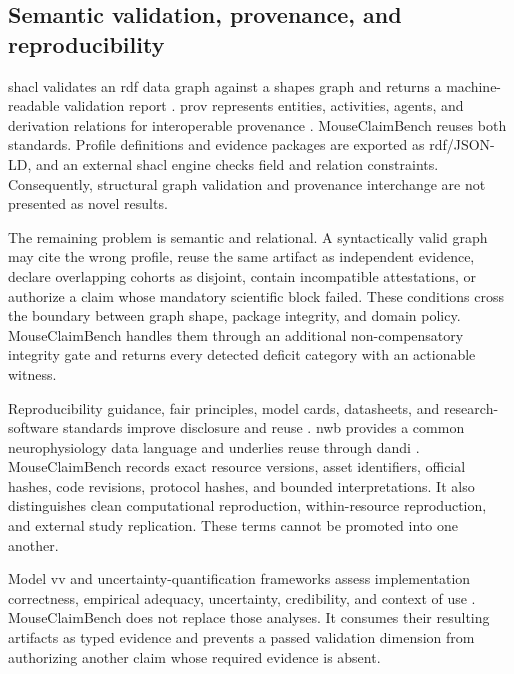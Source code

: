 \subsection{Semantic validation, provenance, and reproducibility}
\label{subsec:semantic-standards}

\ac{shacl} validates an \ac{rdf} data graph against a shapes graph and returns a machine-readable validation report \citep{w3c2017shacl}. \ac{prov} represents entities, activities, agents, and derivation relations for interoperable provenance \citep{lebo2013provo}. MouseClaimBench reuses both standards. Profile definitions and evidence packages are exported as \ac{rdf}/JSON-LD, and an external \ac{shacl} engine checks field and relation constraints. Consequently, structural graph validation and provenance interchange are not presented as novel results.

The remaining problem is semantic and relational. A syntactically valid graph may cite the wrong profile, reuse the same artifact as independent evidence, declare overlapping cohorts as disjoint, contain incompatible attestations, or authorize a claim whose mandatory scientific block failed. These conditions cross the boundary between graph shape, package integrity, and domain policy. MouseClaimBench handles them through an additional non-compensatory integrity gate and returns every detected deficit category with an actionable witness.

Reproducibility guidance, \ac{fair} principles, model cards, datasheets, and research-software standards improve disclosure and reuse \citep{nasem2019reproducibility,wilkinson2016fair,mitchell2019modelcards,gebru2021datasheets,pineau2021reproducibility,barker2022fair4rs}. \ac{nwb} provides a common neurophysiology data language and underlies reuse through \ac{dandi} \citep{rubel2022nwb}. MouseClaimBench records exact resource versions, asset identifiers, official hashes, code revisions, protocol hashes, and bounded interpretations. It also distinguishes clean computational reproduction, within-resource reproduction, and external study replication. These terms cannot be promoted into one another.

Model \ac{vv} and uncertainty-quantification frameworks assess implementation correctness, empirical adequacy, uncertainty, credibility, and context of use \citep{oberkampf2010verification,sargent2013verification,asme2018vv40,riedmaier2021vvuq}. MouseClaimBench does not replace those analyses. It consumes their resulting artifacts as typed evidence and prevents a passed validation dimension from authorizing another claim whose required evidence is absent.

